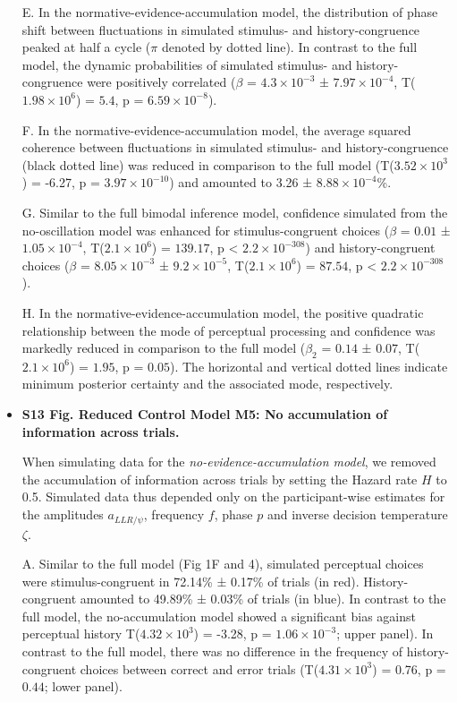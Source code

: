 \documentclass[
]{article}
\begin{document}
\begin{itemize}
E. In the normative-evidence-accumulation model, the distribution of
phase shift between fluctuations in simulated stimulus- and
history-congruence peaked at half a cycle (\(\pi\) denoted by dotted
line). In contrast to the full model, the dynamic probabilities of
simulated stimulus- and history-congruence were positively correlated
(\(\beta\) = \(\ensuremath{4.3\times 10^{-3}}\) ±
\(\ensuremath{7.97\times 10^{-4}}\),
T(\(\ensuremath{1.98\times 10^{6}}\)) = \(5.4\), p =
\(\ensuremath{6.59\times 10^{-8}}\)).

F. In the normative-evidence-accumulation model, the average squared
coherence between fluctuations in simulated stimulus- and
history-congruence (black dotted line) was reduced in comparison to the
full model (T(\ensuremath{3.52\times 10^{3}}) = -6.27, p =
\(\ensuremath{3.97\times 10^{-10}}\)) and amounted to 3.26 ±
\ensuremath{8.88\times 10^{-4}}\%.

G. Similar to the full bimodal inference model, confidence simulated
from the no-oscillation model was enhanced for stimulus-congruent
choices (\(\beta\) = \(0.01\) ± \(\ensuremath{1.05\times 10^{-4}}\),
T(\(\ensuremath{2.1\times 10^{6}}\)) = \(139.17\), p < \(\ensuremath{2.2\times 10^{-308}}\)) and
history-congruent choices (\(\beta\) =
\(\ensuremath{8.05\times 10^{-3}}\) ±
\(\ensuremath{9.2\times 10^{-5}}\), T(\(\ensuremath{2.1\times 10^{6}}\))
= \(87.54\), p < \(\ensuremath{2.2\times 10^{-308}}\)).

H. In the normative-evidence-accumulation model, the positive quadratic
relationship between the mode of perceptual processing and confidence
was markedly reduced in comparison to the full model (\(\beta_2\) =
\(0.14\) ± \(0.07\), T(\(\ensuremath{2.1\times 10^{6}}\)) = \(1.95\), p
= \(0.05\)). The horizontal and vertical dotted lines indicate minimum
posterior certainty and the associated mode, respectively.

\item \textbf{S13 Fig. Reduced Control Model M5: No accumulation of information across trials.}

When simulating data for the
\emph{no-evidence-accumulation model}, we removed the accumulation of
information across trials by setting the Hazard rate \(H\) to 0.5.
Simulated data thus depended only on the participant-wise estimates for
the amplitudes \(a_{LLR/\psi}\), frequency \(f\), phase \(p\) and
inverse decision temperature \(\zeta\).

A. Similar to the full model (Fig 1F and 4), simulated
perceptual choices were stimulus-congruent in 72.14\% ± 0.17\% of trials
(in red). History-congruent amounted to 49.89\% ± 0.03\% of trials (in
blue). In contrast to the full model, the no-accumulation model showed a
significant bias against perceptual history
T(\ensuremath{4.32\times 10^{3}}) = -3.28, p =
\(\ensuremath{1.06\times 10^{-3}}\); upper panel). In contrast to the
full model, there was no difference in the frequency of
history-congruent choices between correct and error trials
(T(\ensuremath{4.31\times 10^{3}}) = 0.76, p = \(0.44\); lower panel).


\end{itemize}
\end{document}
